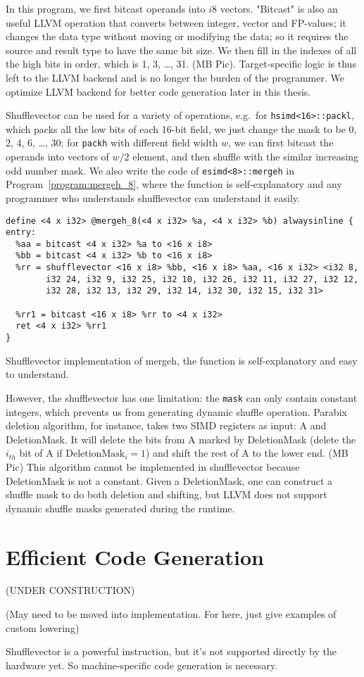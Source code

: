 In this program, we first bitcast operands into $i8$ vectors. "Bitcast" is also an useful LLVM operation that converts between integer, vector and FP-values; it changes the data type without moving or modifying the data; so it requires the source and result type to have the same bit size. We then fill in the indexes of all the high bits in order, which is 1, 3, \ldots, 31. (MB Pic). Target-specific logic is thus left to the LLVM backend and is no longer the burden of the programmer. We optimize LLVM backend for better code generation later in this thesis.

Shufflevector can be used for a variety of operations, e.g.\ for \verb|hsimd<16>::packl|, which packs all the low bits of each 16-bit field, we just change the mask to be 0, 2, 4, 6, \ldots, 30; for {\tt packh} with different field width $w$, we can first bitcast the operands into vectors of $w/2$ element, and then shuffle with the similar increasing odd number mask. We also write the code of \verb|esimd<8>::mergeh| in Program~\ref{program:mergeh_8}, where the function is self-explanatory and any programmer who understands shufflevector can understand it easily.

\begin{program}
\begin{verbatim}
define <4 x i32> @mergeh_8(<4 x i32> %a, <4 x i32> %b) alwaysinline {
entry:
  %aa = bitcast <4 x i32> %a to <16 x i8>
  %bb = bitcast <4 x i32> %b to <16 x i8>
  %rr = shufflevector <16 x i8> %bb, <16 x i8> %aa, <16 x i32> <i32 8,
        i32 24, i32 9, i32 25, i32 10, i32 26, i32 11, i32 27, i32 12,
        i32 28, i32 13, i32 29, i32 14, i32 30, i32 15, i32 31>

  %rr1 = bitcast <16 x i8> %rr to <4 x i32>
  ret <4 x i32> %rr1
}
\end{verbatim}
\caption[Shufflevector implementation of mergeh.]{Shufflevector implementation of mergeh, the function is self-explanatory and easy to understand.}
\label{program:mergeh_8}
\end{program}

However, the shufflevector has one limitation: the {\tt mask} can only contain constant integers, which prevents us from generating dynamic shuffle operation. Parabix deletion algorithm, for instance, takes two SIMD registers as input: A and DeletionMask. It will delete the bits from A marked by DeletionMask (delete the $i_{th}$ bit of A if $\text{DeletionMask}_i = 1$) and shift the rest of A to the lower end. (MB Pic) This algorithm cannot be implemented in shufflevector because DeletionMask is not a constant. Given a DeletionMask, one can construct a shuffle mask to do both deletion and shifting, but LLVM does not support dynamic shuffle masks generated during the runtime.

\section{Efficient Code Generation}
(UNDER CONSTRUCTION)

(May need to be moved into implementation. For here, just give examples of custom lowering)

Shufflevector is a powerful instruction, but it's not supported directly by the hardware yet. So machine-specific code generation is necessary.
